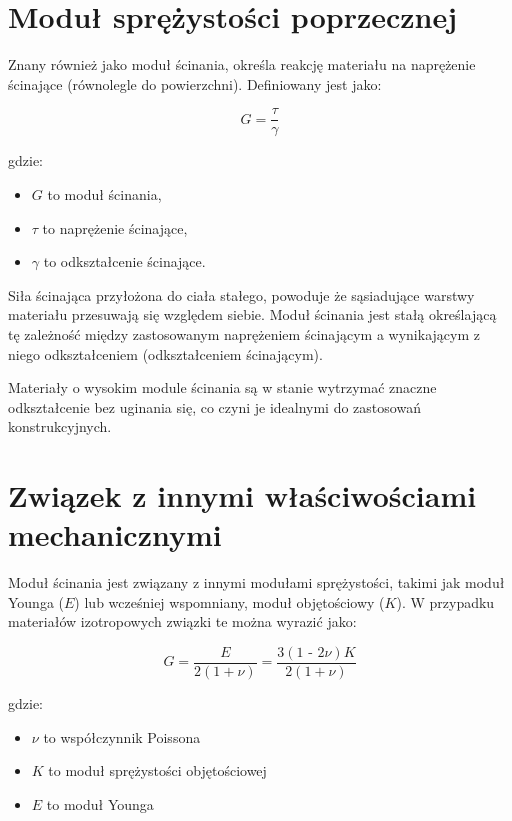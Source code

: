 {}
\justify
\fontsize{14}{16}\selectfont
\setlength{\parindent}{0pt}
\section*{Moduł sprężystości poprzecznej \cite{alma991001031769708832}} 
\label{chap:wstep}
\fontsize{12}{14}\selectfont
\vspace{\baselineskip} 

Znany również jako moduł ścinania, określa reakcję materiału na naprężenie ścinające (równolegle do powierzchni).
Definiowany jest jako:

$$
G = \frac{\tau}{\gamma}
$$

gdzie:
\begin{itemize}
  \item $G$ to moduł ścinania,
  \item $\tau$ to naprężenie ścinające,
  \item $\gamma$ to odkształcenie ścinające.
\end{itemize}

Siła ścinająca przyłożona do ciała stałego, powoduje że sąsiadujące warstwy materiału przesuwają się względem siebie. Moduł ścinania jest stałą określającą tę zależność między zastosowanym naprężeniem ścinającym a wynikającym z niego odkształceniem (odkształceniem ścinającym).

Materiały o wysokim module ścinania są w stanie wytrzymać znaczne odkształcenie bez uginania się, co czyni je idealnymi do zastosowań konstrukcyjnych.

{}
\section*{Związek z innymi właściwościami mechanicznymi \cite{alma991000386409708832}}
\vspace{-1.0em}
\label{sec:spacing_font_size}

Moduł ścinania jest związany z innymi modułami sprężystości, takimi jak moduł Younga ($E$) lub wcześniej wspomniany, moduł objętościowy ($K$). W przypadku materiałów izotropowych związki te można wyrazić jako:

$$
G = \frac{E}{2(1 + \nu)} = \frac{3(1 \text{ - } 2\nu)K}{2(1 + \nu)}
$$

gdzie:
\begin{itemize}
  \item $\nu$ to współczynnik Poissona
  \item $K$ to moduł sprężystości objętościowej
  \item $E$ to moduł Younga
\end{itemize}


